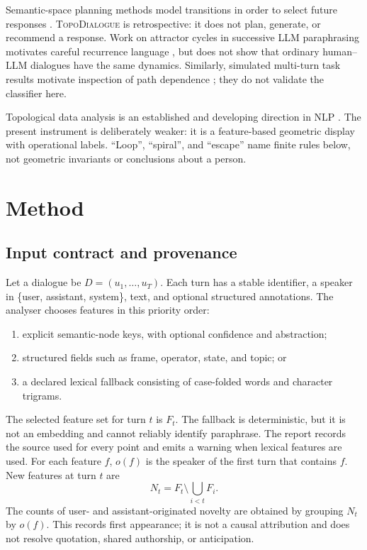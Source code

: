 \documentclass[11pt]{article}
\newcommand{\system}{\textsc{TopoDialogue}}
\begin{document}
Semantic-space planning methods model transitions in order to select future
responses \citep{chen2025scope}. \system{} is retrospective: it does not plan,
generate, or recommend a response. Work on attractor cycles in successive LLM
paraphrasing motivates careful recurrence language \citep{wang2025attractor},
but does not show that ordinary human--LLM dialogues have the same dynamics.
Similarly, simulated multi-turn task results motivate inspection of path
dependence \citep{laban2025lost}; they do not validate the classifier here.

Topological data analysis is an established and developing direction in NLP
\citep{uchendu2026tda}. The present instrument is deliberately weaker: it is a
feature-based geometric display with operational labels. ``Loop'', ``spiral'',
and ``escape'' name finite rules below, not geometric invariants or conclusions
about a person.

\section{Method}

\subsection{Input contract and provenance}

Let a dialogue be $D=(u_1,\ldots,u_T)$. Each turn has a stable identifier, a
speaker in \{user, assistant, system\}, text, and optional structured
annotations. The analyser chooses features in this priority order:

\begin{enumerate}
  \item explicit semantic-node keys, with optional confidence and abstraction;
  \item structured fields such as frame, operator, state, and topic; or
  \item a declared lexical fallback consisting of case-folded words and
        character trigrams.
\end{enumerate}

The selected feature set for turn $t$ is $F_t$. The fallback is deterministic,
but it is not an embedding and cannot reliably identify paraphrase. The report
records the source used for every point and emits a warning when lexical
features are used. For each feature $f$, $o(f)$ is the speaker of the first turn
that contains $f$. New features at turn $t$ are
\begin{equation}
N_t=F_t\setminus\bigcup_{i<t}F_i.
\end{equation}
The counts of user- and assistant-originated novelty are obtained by grouping
$N_t$ by $o(f)$. This records first appearance; it is not a causal attribution
and does not resolve quotation, shared authorship, or anticipation.
\end{document}
